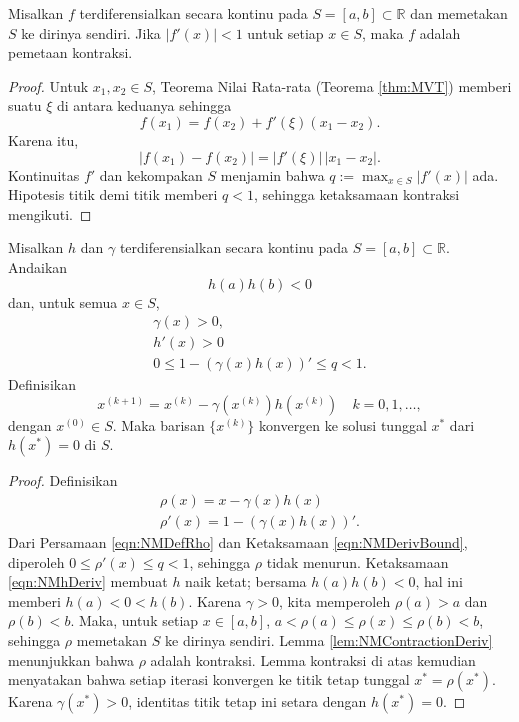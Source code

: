 \begin{lemma} Misalkan $f$ terdiferensialkan secara kontinu pada $S=[a,b]\subset\mathbb{R}$ dan memetakan $S$ ke dirinya sendiri. Jika $|f'(x)|<1$ untuk setiap $x\in S$, maka $f$ adalah pemetaan kontraksi.
\label{lem:NMContractionDeriv}
\end{lemma}
\begin{proof} Untuk $x_1,x_2\in S$, Teorema Nilai Rata-rata (Teorema \ref{thm:MVT}) memberi suatu $\xi$ di antara keduanya sehingga
\begin{equation}
f(x_1)=f(x_2)+f'(\xi)(x_1-x_2).
\end{equation}
Karena itu,
\begin{equation}
|f(x_1)-f(x_2)|=|f'(\xi)|\,|x_1-x_2|.
\end{equation}
Kontinuitas $f'$ dan kekompakan $S$ menjamin bahwa $q:=\max_{x\in S}|f'(x)|$ ada. Hipotesis titik demi titik memberi $q<1$, sehingga ketaksamaan kontraksi mengikuti.
\end{proof}

\begin{theorem} Misalkan $h$ dan $\gamma$ terdiferensialkan secara kontinu pada $S=[a,b]\subset\mathbb{R}$. Andaikan
\label{thm:NMPreReq}
\begin{equation}
h(a)h(b)<0
\end{equation}
dan, untuk semua $x\in S$,
\begin{gather}
\gamma(x)>0,\\
h'(x)>0 \label{eqn:NMhDeriv}\\
0\leq1-(\gamma(x)h(x))'\leq q<1.\label{eqn:NMDerivBound}
\end{gather}
Definisikan
\begin{equation}
x^{(k+1)}=x^{(k)}-\gamma(x^{(k)})h(x^{(k)})\quad k=0,1,\dots,
\end{equation}
dengan $x^{(0)}\in S$. Maka barisan $\{x^{(k)}\}$ konvergen ke solusi tunggal $x^*$ dari $h(x^*)=0$ di $S$.
\end{theorem}
\begin{proof} Definisikan
\begin{gather}
\rho(x)=x-\gamma(x)h(x) \label{eqn:NMDefRho}\\
\rho'(x)=1-(\gamma(x)h(x))'.
\end{gather}
Dari Persamaan \ref{eqn:NMDefRho} dan Ketaksamaan \ref{eqn:NMDerivBound}, diperoleh $0\leq\rho'(x)\leq q<1$, sehingga $\rho$ tidak menurun. Ketaksamaan \ref{eqn:NMhDeriv} membuat $h$ naik ketat; bersama $h(a)h(b)<0$, hal ini memberi $h(a)<0<h(b)$. Karena $\gamma>0$, kita memperoleh $\rho(a)>a$ dan $\rho(b)<b$. Maka, untuk setiap $x\in[a,b]$,
$a<\rho(a)\leq\rho(x)\leq\rho(b)<b$, sehingga $\rho$ memetakan $S$ ke dirinya sendiri. Lemma \ref{lem:NMContractionDeriv} menunjukkan bahwa $\rho$ adalah kontraksi. Lemma kontraksi di atas kemudian menyatakan bahwa setiap iterasi konvergen ke titik tetap tunggal $x^*=\rho(x^*)$. Karena $\gamma(x^*)>0$, identitas titik tetap ini setara dengan $h(x^*)=0$.
\end{proof}

